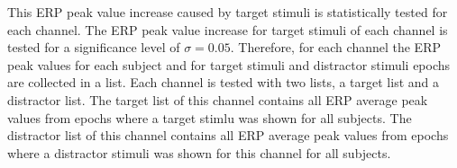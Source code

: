 \documentclass[a4paper]{article}
\begin{document}
This ERP peak value increase caused by target stimuli is statistically tested for each channel.
The ERP peak value increase for target stimuli of each channel is tested for a significance level of $\sigma=0.05$.
Therefore, for each channel the ERP peak values for each subject and for target stimuli and distractor stimuli epochs are collected in a list.
Each channel is tested with two lists, a target list and a distractor list.
The target list of this channel contains all ERP average peak values from epochs where a target stimlu was shown for all subjects.
The distractor list of this channel contains all ERP average peak values from epochs where a distractor stimuli was shown for this channel for all subjects.

\end{document}
